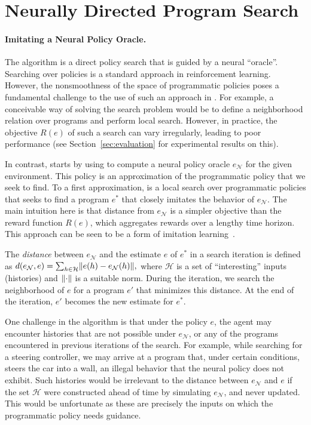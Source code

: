 \newcommand{\NN}{\mathcal{N}}
\newcommand{\syn}{\mathit{syn}}

\section{Neurally Directed Program Search}
\label{sec:algorithm}

\paragraph{Imitating a Neural Policy Oracle.}

The \algo algorithm is a direct policy search that is guided by a neural ``oracle''. Searching over policies is a standard approach in reinforcement learning. However, the nonsmoothness of the space of programmatic policies poses a fundamental challenge 
to the use of such an approach in \sygurl. For example, a conceivable way of solving the search problem would be to 
define a neighborhood relation over programs and perform local search. However, in practice, the objective $R(e)$ of such a search can vary irregularly, leading to poor performance (see Section~\ref{sec:evaluation} for experimental results on this).

In contrast, \algo starts by using \drl to compute a neural policy oracle $e_\NN$ for the given environment. This policy is an approximation of the programmatic policy that we seek to find. To a first approximation, \algo is a local search over programmatic policies that seeks to find a program $e^*$ that closely imitates the behavior of $e_\NN$. The main intuition here is that distance from $e_\NN$ is a simpler objective than the reward function $R(e)$, which aggregates rewards over a lengthy time horizon. This approach can be seen to be a form of imitation learning~\citep{schaal1999imitation}.

The {\em distance} between $e_\NN$ and the estimate $e$ of $e^*$ in a search iteration is defined as 
$
d(e_\NN, e) = \sum_{h \in \mathcal{H}} \norm{e(h) - e_\NN(h)}, 
$
where $\mathcal{H}$ is a set of ``interesting'' inputs (histories) and $\lVert\cdot\rVert$ is a suitable norm. During the iteration, we search the neighborhood of $e$ for a program $e'$ that minimizes this distance. At the end of the iteration, 
$e'$ becomes the new estimate for $e^*$.

 One challenge in the algorithm is that under the policy $e$, the agent may encounter histories that are not possible under $e_\NN$, or any of the programs encountered in previous iterations of the search. For example, while searching for a steering controller, we may arrive at a program that, under certain conditions, steers the car into a wall, an illegal behavior that the neural policy does not exhibit. Such histories would be irrelevant to the distance between $e_\NN$ and $e$ if the set $\mathcal{H}$ were constructed ahead of time by simulating $e_\NN$, and never updated. This would be unfortunate as these are precisely the inputs on which the programmatic policy needs guidance. 

